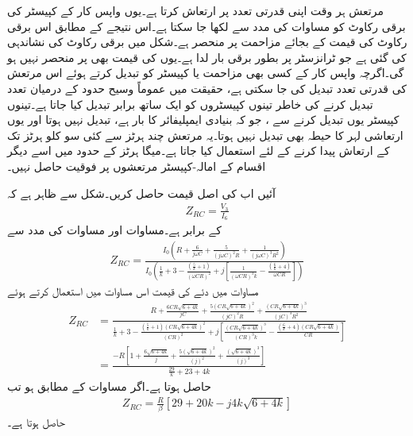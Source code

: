 مرتعش ہر وقت اپنی قدرتی تعدد پر ارتعاش کرتا ہے۔یوں واپس کار کے کپیسٹر کی برقی رکاوٹ  کو مساوات  کی مدد سے  لکھا جا سکتا ہے۔اس نتیجے کے مطابق اس برقی رکاوٹ کی قیمت  کے بجائے مزاحمت  پر منحصر ہے۔شکل  میں برقی رکاوٹ  کی نشاندہی کی گئی ہے جو ٹرانزسٹر پر بطور برقی بار لدا ہے۔یوں  کی قیمت بھی  پر منحصر نہیں ہو گی۔اگرچہ واپس کار کے کسی بھی مزاحمت یا کپیسٹر کو تبدیل کرتے ہوئے اس مرتعش کی قدرتی تعدد تبدیل کی جا سکتی ہے، حقیقت میں عموماً وسیح حدود کے درمیان تعدد تبدیل کرنے کی خاطر تینوں کپیسٹروں کو ایک ساتھ برابر تبدیل کیا جاتا ہے۔تینوں کپیسٹر یوں تبدیل کرنے سے  ، جو کہ بنیادی ایمپلیفائر کا بار ہے، تبدیل نہیں ہوتا اور یوں ارتعاشی لہر کا حیطہ بھی تبدیل نہیں ہوتا۔یہ مرتعش چند ہرٹز  سے کئی سو کلو ہرٹز   تک کے ارتعاش پیدا کرنے کے لئے استعمال کیا جاتا ہے۔میگا ہرٹز  کے حدود میں اسے دیگر اقسام کے امالہ-کپیسٹر  مرتعشوں پر فوقیت حاصل نہیں۔

آئیں اب  کی اصل قیمت حاصل کریں۔شکل سے ظاہر ہے کہ
\begin{align*}
Z_{RC}=\frac{V_3}{I_6}
\end{align*}
کے برابر ہے۔مساوات  اور مساوات  کی مدد سے
\begin{align*}
Z_{RC}=\frac{I_0 \left(R+\frac{6}{j \omega C}+\frac{5}{\left(j \omega C \right )^2 R} +\frac{1}{\left(j \omega C \right )^3 R^2}\right)}{I_0 \left( \frac{1}{k}+3 -\frac{\left(\frac{5}{k}+1 \right )}{\left(\omega C R \right)^2}+j \left [\frac{1}{\left (\omega C R \right)^3 k}  -\frac{\left(\frac{6}{k}+4 \right)}{\omega C R}\right] \right )}
\end{align*}
مساوات  میں دئے  کی قیمت اس مساوات میں استعمال کرتے ہوئے
\begin{align*}
Z_{RC}&=\frac{ R+\frac{6 CR\sqrt{6+4k}}{j C}+\frac{5 \left(CR\sqrt{6+4k} \right)^2}{\left(j C \right )^2 R} +\frac{\left(CR\sqrt{6+4k} \right)^3}{\left(j C \right )^3 R^2}}{  \frac{1}{k}+3 -\frac{\left(\frac{5}{k}+1 \right ) \left(CR\sqrt{6+4k} \right)^2}{\left( C R \right)^2}+j \left [\frac{\left(CR\sqrt{6+4k} \right)^3}{\left (C R \right)^3 k}  -\frac{\left(\frac{6}{k}+4 \right)\left(CR\sqrt{6+4k} \right)}{C R}\right] }\\
&=\frac{-R \left[ 1+\frac{6\sqrt{6+4k}}{j }+\frac{5 \left(\sqrt{6+4k} \right)^2}{\left(j \right )^2} +\frac{\left(\sqrt{6+4k} \right)^3}{\left(j \right )^3} \right]}{\frac{29}{k}+23 +4k}
\end{align*}
حاصل ہوتا ہے۔اگر   مساوات  کے مطابق ہو تب
\begin{align}
Z_{RC}=\frac{R}{\beta} \left[ 29+20k -j 4 k \sqrt{6+4k}\right]
\end{align}
حاصل ہوتا ہے۔

